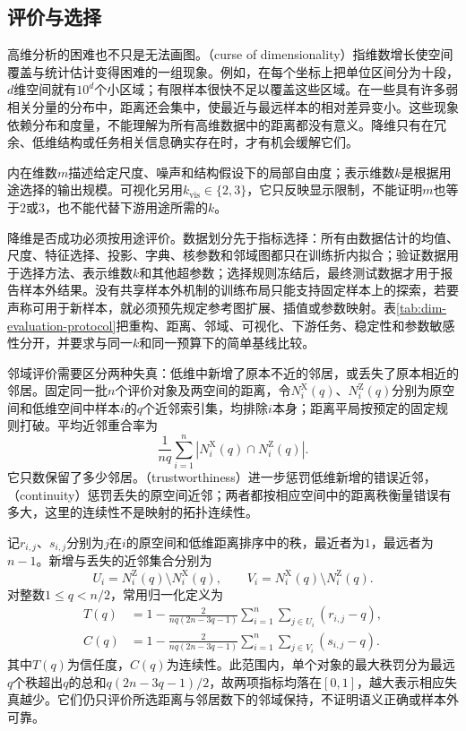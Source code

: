 \FloatBarrier
\subsection{评价与选择}

高维分析的困难也不只是无法画图。（curse of dimensionality）指维数增长使空间覆盖与统计估计变得困难的一组现象。例如，在每个坐标上把单位区间分为十段，$d$维空间就有$10^d$个小区域；有限样本很快不足以覆盖这些区域。在一些具有许多弱相关分量的分布中，距离还会集中，使最近与最远样本的相对差异变小。这些现象依赖分布和度量，不能理解为所有高维数据中的距离都没有意义。降维只有在冗余、低维结构或任务相关信息确实存在时，才有机会缓解它们。

内在维数$m$描述给定尺度、噪声和结构假设下的局部自由度；表示维数$k$是根据用途选择的输出规模。可视化另用$k_{\mathrm{vis}}\in\{2,3\}$，它只反映显示限制，不能证明$m$也等于$2$或$3$，也不能代替下游用途所需的$k$。

降维是否成功必须按用途评价。数据划分先于指标选择：所有由数据估计的均值、尺度、特征选择、投影、字典、核参数和邻域图都只在训练折内拟合；验证数据用于选择方法、表示维数$k$和其他超参数；选择规则冻结后，最终测试数据才用于报告样本外结果。没有共享样本外机制的训练布局只能支持固定样本上的探索，若要声称可用于新样本，就必须预先规定参考图扩展、插值或参数映射。表\ref{tab:dim-evaluation-protocol}把重构、距离、邻域、可视化、下游任务、稳定性和参数敏感性分开，并要求与同一$k$和同一预算下的简单基线比较。

邻域评价需要区分两种失真：低维中新增了原本不近的邻居，或丢失了原本相近的邻居。固定同一批$n$个评价对象及两空间的距离，令$N_i^{\mathrm{X}}(q)$、$N_i^{\mathrm{Z}}(q)$分别为原空间和低维空间中样本$i$的$q$个近邻索引集，均排除$i$本身；距离平局按预定的固定规则打破。平均近邻重合率为
\[
  \frac{1}{nq}\sum_{i=1}^{n}
  \left|N_i^{\mathrm{X}}(q)\cap N_i^{\mathrm{Z}}(q)\right|.
\]
它只数保留了多少邻居。（trustworthiness）进一步惩罚低维新增的错误近邻，（continuity）惩罚丢失的原空间近邻；两者都按相应空间中的距离秩衡量错误有多大，这里的连续性不是映射的拓扑连续性。

记$r_{i,j}$、$s_{i,j}$分别为$j$在$i$的原空间和低维距离排序中的秩，最近者为$1$，最远者为$n-1$。新增与丢失的近邻集合分别为
\[
  U_i=N_i^{\mathrm{Z}}(q)\setminus N_i^{\mathrm{X}}(q),
  \qquad
  V_i=N_i^{\mathrm{X}}(q)\setminus N_i^{\mathrm{Z}}(q).
\]
对整数$1\leq q<n/2$，常用归一化定义为
\begin{equation}
  \begin{aligned}
    T(q)
      &=1-\frac{2}{nq(2n-3q-1)}
        \sum_{i=1}^{n}\sum_{j\in U_i}(r_{i,j}-q),\\
    C(q)
      &=1-\frac{2}{nq(2n-3q-1)}
        \sum_{i=1}^{n}\sum_{j\in V_i}(s_{i,j}-q).
  \end{aligned}
  \label{eq:dim-neighborhood-quality}
\end{equation}
其中$T(q)$为信任度，$C(q)$为连续性。此范围内，单个对象的最大秩罚分为最远$q$个秩超出$q$的总和$q(2n-3q-1)/2$，故两项指标均落在$[0,1]$，越大表示相应失真越少。它们仍只评价所选距离与邻居数下的邻域保持，不证明语义正确或样本外可靠。

